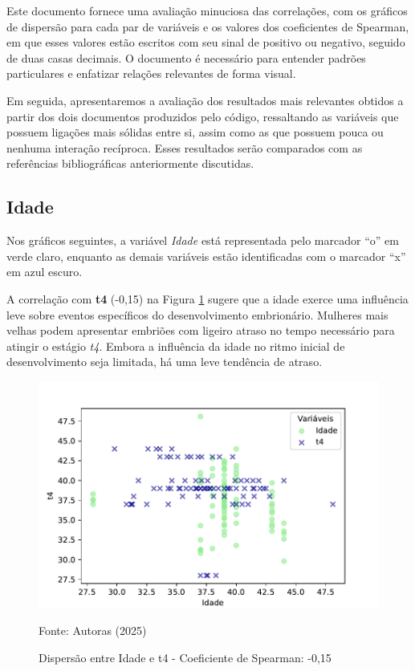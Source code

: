 Este documento fornece uma avaliação minuciosa das correlações, com os gráficos de dispersão para cada par de variáveis e os valores dos coeficientes de Spearman, em que esses valores estão escritos com seu sinal de positivo ou negativo, seguido de duas casas decimais. O documento é necessário para entender padrões particulares e enfatizar relações relevantes de forma visual.

Em seguida, apresentaremos a avaliação dos resultados mais relevantes obtidos a partir dos dois documentos produzidos pelo código, ressaltando as variáveis que possuem ligações mais sólidas entre si, assim como as que possuem pouca ou nenhuma interação recíproca. Esses resultados serão comparados com as referências bibliográficas anteriormente discutidas.


\subsection*{Idade}

Nos gráficos seguintes, a variável \textit{Idade} está representada pelo marcador “o” em verde claro, enquanto as demais variáveis estão identificadas com o marcador “x” em azul escuro. 

A correlação com \textbf{t4} (-0,15) na Figura \ref{fig:idade-t4} sugere que a idade exerce uma influência leve sobre eventos específicos do desenvolvimento embrionário. Mulheres mais velhas podem apresentar embriões com ligeiro atraso no tempo necessário para atingir o estágio \textit{t4}. Embora a influência da idade no ritmo inicial de desenvolvimento seja limitada, há uma leve tendência de atraso.

\begin{figure}[h]
    \captionsetup{font=footnotesize, justification=centering, labelsep=period, position=above}
    \caption{Dispersão entre Idade e t4 - Coeficiente de Spearman: -0,15}
    \label{fig:idade-t4}
    \centering
    \includegraphics[scale=0.3]{figuras/Spearman/idade-t4.pdf}
    \vspace{0.3cm} 
    \begin{minipage}{\linewidth}
        \centering
        \scriptsize{Fonte: Autoras (2025)}
    \end{minipage}
\end{figure}
\FloatBarrier

